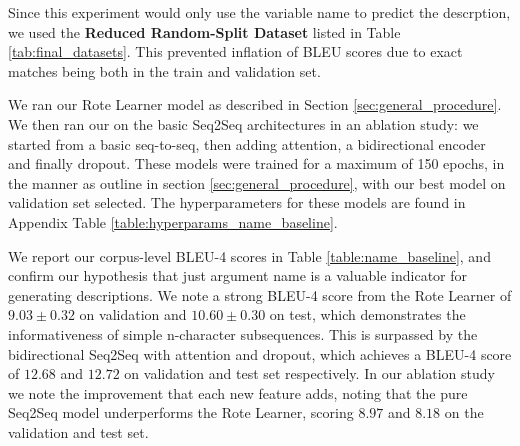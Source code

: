 Since this experiment would only use the variable name to predict the descrption, we used the \textbf{Reduced Random-Split Dataset} listed in Table \ref{tab:final_datasets}.
This prevented inflation of BLEU scores due to exact matches being both in the train and validation set.

We ran our Rote Learner model as described in Section \ref{sec:general_procedure}. We then ran our on the basic Seq2Seq architectures in an ablation study: we started from a basic seq-to-seq, then adding attention, a bidirectional encoder and finally dropout.
These models were trained for a maximum of 150 epochs, in the manner as outline in section \ref{sec:general_procedure}, with our best model on validation set selected. 
The hyperparameters for these models are found in Appendix Table \ref{table:hyperparams_name_baseline}.

We report our corpus-level BLEU-4 scores in Table \ref{table:name_baseline}, and confirm our hypothesis that just argument name is a valuable indicator for generating descriptions. We note a strong BLEU-4 score from the Rote Learner of $9.03 \pm 0.32$ on validation and $10.60 \pm  0.30$ on test, which demonstrates the informativeness of simple n-character subsequences. 
This is surpassed by the bidirectional Seq2Seq with attention and dropout,  which achieves a BLEU-4 score of $12.68 $ and $12.72$ on validation and test set respectively.
In our ablation study we note the improvement that each new feature adds, noting that the pure Seq2Seq model underperforms the Rote Learner, scoring $8.97$ and $ 8.18 $ on the validation and test set. 



